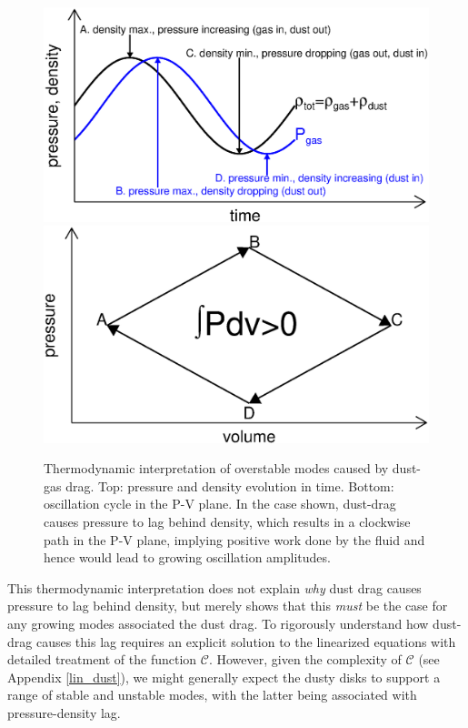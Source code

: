 \begin{figure}
  \includegraphics[width=\linewidth]{figures/drag}\\
\includegraphics[width=\linewidth]{figures/pdv}
  \caption{Thermodynamic interpretation of overstable modes caused by
    dust-gas drag. Top: pressure and density evolution in time. 
    Bottom: oscillation cycle in the P-V plane. In the case shown,
    dust-drag causes 
    pressure to lag behind density, which results in a clockwise path in
    the P-V plane, implying positive work done by the fluid and
    hence would lead to growing oscillation amplitudes.  
    \label{pdv_cartoon}
  }
\end{figure}

This thermodynamic interpretation does not explain
\emph{why} dust drag causes pressure to lag behind density, but merely shows
that this \emph{must} be the case for any growing modes associated the
dust drag. To rigorously understand how dust-drag causes this
lag requires an explicit solution to the linearized equations with
detailed treatment of the function $\mathcal{C}$. However, given the complexity of
$\mathcal{C}$ (see Appendix \ref{lin_dust}), we might generally expect
the dusty disks to  support a range of stable and unstable modes, with the
latter being associated with pressure-density lag. 

